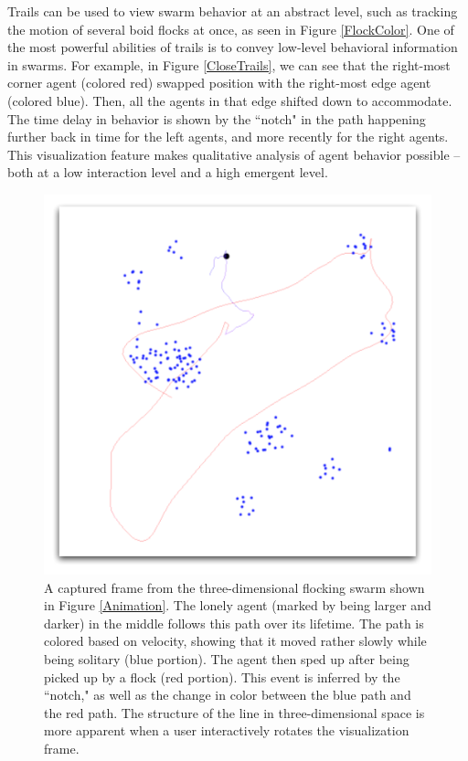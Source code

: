 \documentclass[conference]{IEEEtran}
\begin{document}
Trails can be used to view swarm behavior at an abstract level, such as tracking the motion of several boid
flocks at once, as seen in Figure \ref{FlockColor}.
One of the most powerful abilities of trails is to convey low-level behavioral information in swarms. For example,
in Figure \ref{CloseTrails}, we can see that the right-most corner agent (colored red) swapped position with the right-most
edge agent (colored blue). Then, all the agents in that edge shifted down to accommodate.
The time delay in behavior is shown by the ``notch" in the path happening further back in time for the left agents, and more recently for the right agents.
This visualization feature makes qualitative analysis of agent behavior possible -- both at a low interaction level
and a high emergent level.







\begin{figure}
\centering
\includegraphics[scale=.4]{images/track.pdf}
\caption{
A captured frame from the three-dimensional flocking swarm shown in Figure \ref{Animation}.
The lonely agent (marked by being larger and darker) in the middle follows this path over its lifetime.
The path is colored based on velocity, showing that it moved rather slowly while being solitary (blue portion).
The agent then sped up after being picked up by a flock (red portion). This event is inferred by the ``notch,"
as well as the change in color between the blue path and the red path.
The structure of the line in three-dimensional space is more apparent when a user interactively rotates the visualization frame.}
\label{Track}
\end{figure}
\end{document}
